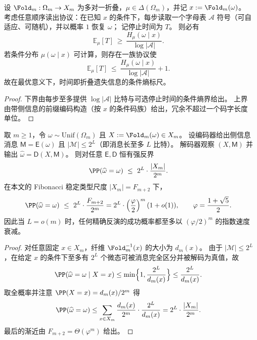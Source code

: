 \begin{theorem}\label{thm:xi-optimal-recovery-time-equals-conditional-entropy}
设 \(\Fold_m:\Omega_m\to X_m\) 为多对一折叠，\(\mu\in\Delta(\Omega_m)\)，并记
\(
x:=\Fold_m(\omega)
\)。
考虑任意顺序读出协议：在已知 \(x\) 的条件下，每步读取一个字母表 \(\mathcal A\) 符号（可自适应、可随机），并以概率 \(1\) 恢复 \(\omega\)；
记停止时间为 \(T\)。
则必有
\[
\mathbb E_\mu[T]\ \ge\ \frac{H_\mu(\omega\mid x)}{\log|\mathcal A|}.
\]
若条件分布 \(\mu(\omega\mid x)\) 可计算，则存在一族协议使
\[
\mathbb E_\mu[T]\ \le\ \frac{H_\mu(\omega\mid x)}{\log|\mathcal A|}+1.
\]
故在最优意义下，时间即折叠遗失信息的条件熵标尺。
\end{theorem}

\begin{proof}
下界由每步至多提供 \(\log|\mathcal A|\) 比特与可选停止时间的条件熵界给出。
上界由带侧信息的前缀编码构造（按 \(x\) 的条件码族）给出，冗余不超过一个码字长度单位。
\end{proof}

\begin{theorem}\label{thm:xi-fold-inversion-strong-converse-sideinfo}
取 \(m\ge 1\)，令 \(\omega\sim\mathrm{Unif}(\Omega_m)\) 且 \(X:=\Fold_m(\omega)\in X_m\)。
设编码器给出侧信息消息 \(\mathsf M=\mathsf E(\omega)\) 且 \(|\mathcal M|\le 2^{L}\)（即消息长至多 \(L\) 比特）。
解码器观察 \((X,\mathsf M)\) 并输出 \(\widehat\omega=\mathsf D(X,\mathsf M)\)。
则对任意 \(\mathsf E,\mathsf D\) 恒有强反界
\[
\PP(\widehat\omega=\omega)\ \le\ 2^{L}\cdot\frac{|X_m|}{2^{m}}.
\]
在本文的 Fibonacci 稳定类型尺度 \(|X_m|=F_{m+2}\) 下，
\[
\PP(\widehat\omega=\omega)\ \le\ 2^{L}\cdot\frac{F_{m+2}}{2^{m}}
=2^{L}\cdot\left(\frac{\varphi}{2}\right)^{m}(1+o(1)),
\qquad
\varphi=\frac{1+\sqrt5}{2}.
\]
因此当 \(L=o(m)\) 时，任何精确反演的成功概率都至多以 \((\varphi/2)^{m}\) 的指数速度衰减。
\end{theorem}
\begin{proof}
对任意固定 \(x\in X_m\)，纤维 \(\Fold_m^{-1}(x)\) 的大小为 \(d_m(x)\)。
由于 \(|\mathcal M|\le 2^L\)，在给定 \(x\) 的条件下至多有 \(2^L\) 个微态可被消息完全区分并被解码为真值，故
\[
\PP(\widehat\omega=\omega\mid X=x)\le \min\Bigl\{1,\frac{2^L}{d_m(x)}\Bigr\}\le \frac{2^L}{d_m(x)}.
\]
取全概率并注意 \(\PP(X=x)=d_m(x)/2^m\) 得
\[
\PP(\widehat\omega=\omega)
\le \sum_{x\in X_m}\frac{d_m(x)}{2^m}\cdot\frac{2^L}{d_m(x)}
=2^L\cdot\frac{|X_m|}{2^m}.
\]
最后的渐近由 \(F_{m+2}=\Theta(\varphi^m)\) 给出。
\end{proof}

